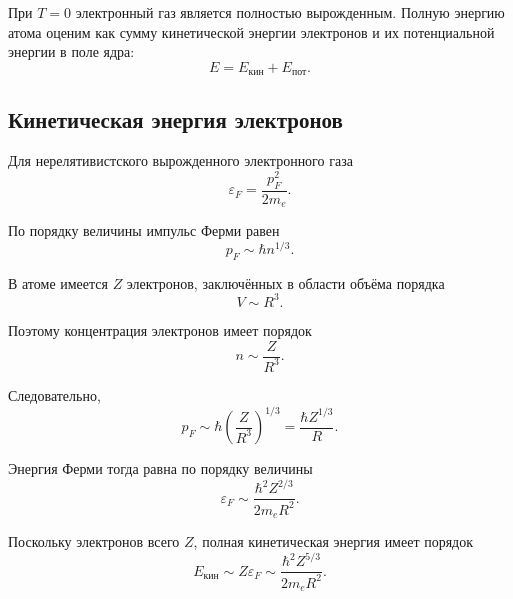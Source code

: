 \documentclass[../final.tex]{subfiles}
\begin{document}

\solution

При $T=0$ электронный газ является полностью вырожденным.
Полную энергию атома оценим как сумму кинетической энергии
электронов и их потенциальной энергии в поле ядра:
%
\begin{equation*}
    E
    =
    E_{\text{кин}}
    +
    E_{\text{пот}}.
\end{equation*}



\subsection*{Кинетическая энергия электронов}

Для нерелятивистского вырожденного электронного газа
%
\begin{equation*}
    \varepsilon_F
    =
    \frac{p_F^2}{2m_e}.
\end{equation*}

По порядку величины импульс Ферми равен
%
\begin{equation*}
    p_F
    \sim
    \hbar n^{1/3}.
\end{equation*}

В атоме имеется $Z$ электронов, заключённых в области объёма
порядка
%
\begin{equation*}
    V
    \sim
    R^3.
\end{equation*}

Поэтому концентрация электронов имеет порядок
%
\begin{equation*}
    n
    \sim
    \frac{Z}{R^3}.
\end{equation*}

Следовательно,
%
\begin{equation*}
    p_F
    \sim
    \hbar
    \left(
        \frac{Z}{R^3}
    \right)^{1/3}
    =
    \frac{\hbar Z^{1/3}}{R}.
\end{equation*}

Энергия Ферми тогда равна по порядку величины
%
\begin{equation*}
    \varepsilon_F
    \sim
    \frac{\hbar^2 Z^{2/3}}{2m_eR^2}.
\end{equation*}

Поскольку электронов всего $Z$, полная кинетическая энергия
имеет порядок
%
\begin{equation*}
    E_{\text{кин}}
    \sim
    Z\varepsilon_F
    \sim
    \frac{\hbar^2Z^{5/3}}{2m_eR^2}.
\end{equation*}
\end{document}
